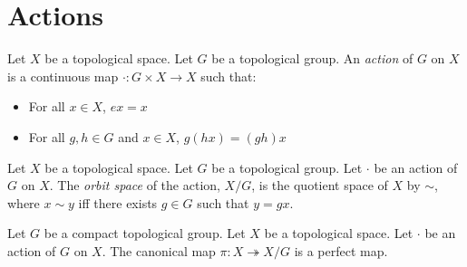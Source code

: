 \section{Actions}

\begin{definition}[Action]
    Let $X$ be a topological space. Let $G$ be a topological group.
    An \emph{action} of $G$ on $X$ is a continuous map $\cdot : G \times X \rightarrow X$
    such that:
    \begin{itemize}
        \item For all $x \in X$, $ex = x$
        \item For all $g, h \in G$ and $x \in X$, $g(hx) = (gh)x$
    \end{itemize}
\end{definition}

\begin{definition}
    Let $X$ be a topological space. Let $G$ be a topological group.
    Let $\cdot$ be an action of $G$ on $X$. The \emph{orbit space}
    of the action, $X / G$, is the quotient space of $X$ by $\sim$,
    where $x \sim y$ iff there exists $g \in G$ such that $y = gx$.
\end{definition}

\begin{proposition}
    Let $G$ be a compact topological group. Let $X$ be a topological space.
    Let $\cdot$ be an action of $G$ on $X$. The canonical map $\pi : X \twoheadrightarrow X / G$
    is a perfect map.
\end{proposition}

